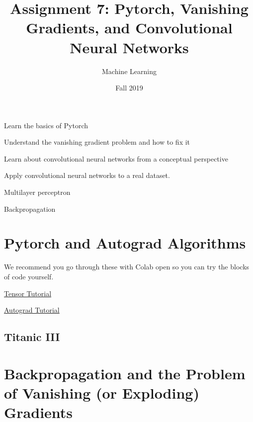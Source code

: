 \documentclass[assignment07_Solutions]{subfiles}
\title{Assignment 7: Pytorch, Vanishing Gradients, and Convolutional Neural Networks}
\author{Machine Learning}
\date{Fall 2019}
\begin{document}
\maketitle
\thispagestyle{firstpage}


\begin{learningobjectives}
\bi
\item Learn the basics of Pytorch
\item Understand the vanishing gradient problem and how to fix it
\item Learn about convolutional neural networks from a conceptual perspective
\item Apply convolutional neural networks to a real dataset.
\ei
\end{learningobjectives}

\begin{priorknowledge}
\bi
\item Multilayer perceptron
\item Backpropagation
\ei
\end{priorknowledge}

\section{Pytorch and Autograd Algorithms}

\begin{externalresources}
We recommend you go through these with Colab open so you can try the blocks of code yourself.
\bi
\item \href{https://pytorch.org/tutorials/beginner/blitz/tensor_tutorial.html}{Tensor Tutorial}
\item \href{https://pytorch.org/tutorials/beginner/blitz/autograd_tutorial.html}{Autograd Tutorial}
\ei
\end{externalresources}

\subsection{Titanic III}

\section{Backpropagation and the Problem of Vanishing (or Exploding) Gradients}
\end{document}
